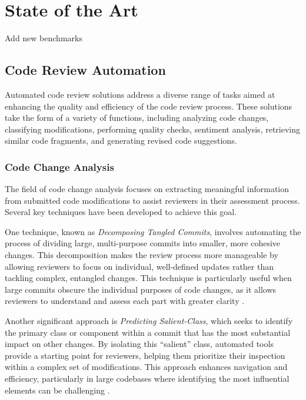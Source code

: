 \section{State of the Art}

 {\color{red} Add new benchmarks}
\subsection{Code Review Automation}

Automated code review solutions address a diverse range of tasks aimed at
enhancing the quality and efficiency of the code review process. These
solutions take the form of a variety of functions, including analyzing code
changes, classifying modifications, performing quality checks, sentiment
analysis, retrieving similar code fragments, and generating revised code
suggestions.

\subsubsection{Code Change Analysis}

The field of code change analysis focuses on extracting meaningful information
from submitted code modifications to assist reviewers in their assessment
process. Several key techniques have been developed to achieve this goal.

One technique, known as \textit{Decomposing Tangled Commits}, involves
automating the process of dividing large, multi-purpose commits into smaller,
more cohesive changes. This decomposition makes the review process more
manageable by allowing reviewers to focus on individual, well-defined updates
rather than tackling complex, entangled changes. This technique is particularly
useful when large commits obscure the individual purposes of code changes, as
it allows reviewers to understand and assess each part with greater clarity
\cite{barnett:icse2015,tao:msr2015,wang:ase2019}.

Another significant approach is \textit{Predicting Salient-Class}, which seeks
to identify the primary class or component within a commit that has the most
substantial impact on other changes. By isolating this ``salient'' class,
automated tools provide a starting point for reviewers, helping them prioritize
their inspection within a complex set of modifications. This approach enhances
navigation and efficiency, particularly in large codebases where identifying
the most influential elements can be challenging \cite{huang:tse2020}.

